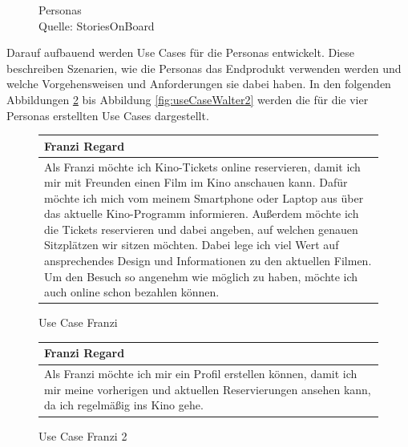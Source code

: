 \begin{figure}[H]
			\caption[Personas ]{\label{fig:personas}Personas \\ Quelle: StoriesOnBoard \footnotemark}
		\end{figure} 
		
		Darauf aufbauend werden Use Cases für die Personas entwickelt. Diese beschreiben Szenarien, wie die Personas das Endprodukt verwenden werden und welche Vorgehensweisen und Anforderungen sie dabei haben. In den folgenden Abbildungen \ref{fig:useCaseFranzi} bis Abbildung \ref{fig:useCaseWalter2} werden die für die vier Personas erstellten Use Cases dargestellt.
		
		\begin{figure}[H]
			\begin{tabular}{p{13cm}}
				\textbf{Franzi Regard} \\\toprule
				Als Franzi möchte ich Kino-Tickets online reservieren, damit ich mir mit Freunden einen Film im Kino anschauen kann. Dafür möchte ich mich vom meinem Smartphone oder Laptop aus über das aktuelle Kino-Programm informieren. Außerdem möchte ich die Tickets reservieren und dabei angeben, auf welchen genauen Sitzplätzen wir sitzen möchten. Dabei lege ich viel Wert auf ansprechendes Design und Informationen zu den aktuellen Filmen. Um den Besuch so angenehm wie möglich zu haben, möchte ich auch online schon bezahlen können.
			\end{tabular}
			\caption[Use Case Franzi]{\label{fig:useCaseFranzi} Use Case Franzi}
		\end{figure}
	
		\begin{figure}[H]
			\begin{tabular}{p{13cm}}
				\textbf{Franzi Regard} \\\toprule
				Als Franzi möchte ich mir ein Profil erstellen können, damit ich mir meine vorherigen und aktuellen Reservierungen ansehen kann, da ich regelmäßig ins Kino gehe. 
			\end{tabular}
			\caption[Use Case Franzi 2]{\label{fig:useCaseFranzi2} Use Case Franzi 2}
		\end{figure}
	
